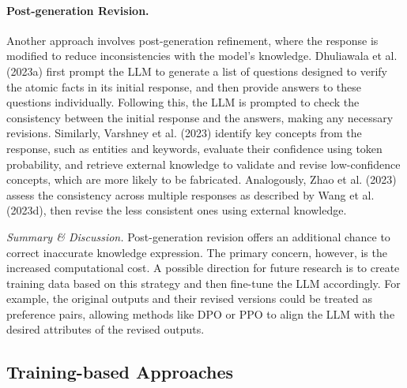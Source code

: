 \paragraph{Post-generation Revision.} Another approach involves post-generation refinement, where the response is modified to reduce inconsistencies with the model's knowledge. Dhuliawala et al. (2023a) first prompt the LLM to generate a list of questions designed to verify the atomic facts in its initial response, and then provide answers to these questions individually. Following this, the LLM is prompted to check the consistency between the initial response and the answers, making any necessary revisions. Similarly, Varshney et al. (2023) identify key concepts from the response, such as entities and keywords, evaluate their confidence using token probability, and retrieve external knowledge to validate and revise low-confidence concepts, which are more likely to be fabricated. Analogously, Zhao et al. (2023) assess the consistency across multiple responses as described by Wang et al. (2023d), then revise the less consistent ones using external knowledge.

\emph{Summary \& Discussion.} Post-generation revision offers an additional chance to correct inaccurate knowledge expression. The primary concern, however, is the increased computational cost. A possible direction for future research is to create training data based on this strategy and then fine-tune the LLM accordingly. For example, the original outputs and their revised versions could be treated as preference pairs, allowing methods like DPO or PPO to align the LLM with the desired attributes of the revised outputs.

\subsection{Training-based Approaches}
\label{sec:se_training_based}

